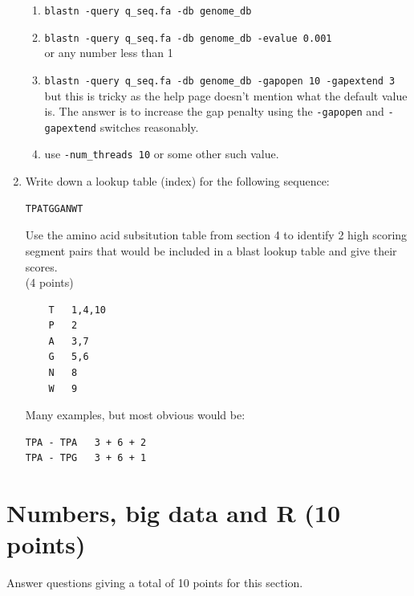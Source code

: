 \documentclass[11pt]{article}
\begin{document}
\begin{enumerate}
\begin{Notes}
  \begin{enumerate} 
  \item \verb|blastn -query q_seq.fa -db genome_db|\\
  \item \verb|blastn -query q_seq.fa -db genome_db -evalue 0.001|\\
    or any number less than 1\\
  \item \verb|blastn -query q_seq.fa -db genome_db -gapopen 10 -gapextend 3|\\
    but this is tricky as the help page doesn't mention what the default value
    is. The answer is to increase the gap penalty using the \verb|-gapopen|
    and \verb|-gapextend| switches reasonably.
  \item use \verb|-num_threads 10| or some other such value.
  \end{enumerate}
\end{Notes}

\item Write down a lookup table (index) for the following sequence:
\begin{verbatim}
TPATGGANWT
\end{verbatim}
Use the amino acid subsitution table from section 4 to identify 2 high scoring segment pairs
that would be included in a blast lookup table and give their scores.\\
 (4 points)

\begin{Notes}
\begin{verbatim}
    T   1,4,10
    P   2
    A   3,7
    G   5,6
    N   8
    W   9
\end{verbatim}
Many examples, but most obvious would be:
\begin{verbatim}
TPA - TPA   3 + 6 + 2
TPA - TPG   3 + 6 + 1
\end{verbatim}
\end{Notes}
\end{enumerate}

\section{Numbers, big data and R (10 points)}
Answer questions giving a total of 10 points for this section.
\end{document}
